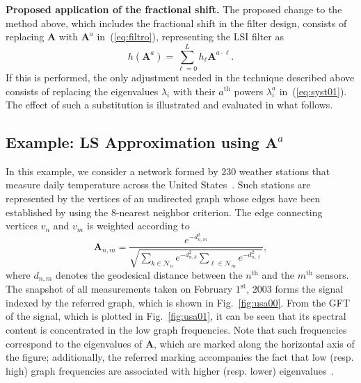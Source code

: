 \noindent\textbf{Proposed application of the fractional shift.} The proposed change to the method above, which includes the fractional shift in the filter design, consists of replacing $\mathbf{A}$ with $\mathbf{A}^a$ in~(\ref{eq:filtro}), representing the LSI filter as
\begin{equation}
    \label{eq:filtrofracnew}
    h(\mathbf{A}^a) = \sum_{\ell=0}^{L} h_\ell \mathbf{A}^{a \cdot \ell}.
\end{equation}
If this is performed, the only adjustment needed in the technique described above consists of replacing the eigenvalues $\lambda_i$ with their $a^{\text{th}}$ powers $\lambda_i^a$ in~(\ref{eq:syst01}). The effect of such a substitution is illustrated and evaluated in what follows.

\subsection{Example: LS Approximation using $\mathbf{A}^{{a}}$}\label{subsec:lsi01}
In this example, we consider a network formed by $230$ weather stations that measure daily temperature across the United States~\parencite{data2011}. Such stations are represented by the vertices of an undirected graph whose edges have been established by using the $8$-nearest neighbor criterion.  The edge connecting vertices $v_n$ and $v_m$ is weighted according to
\begin{equation}
    \mathbf{A}_{n,m}=\frac{e^{-d^2_{n,m}}}{\sqrt{\sum_{k\in\mathcal{N}_n}e^{-d^2_{n,k}}\sum_{\ell\in\mathcal{N}_m}e^{-d^2_{n,\ell}}}},
\end{equation}
where $d_{n,m}$ denotes the geodesical distance between the $n^{\text{th}}$ and the $m^{\text{th}}$ sensors. The snapshot of all measurements taken on February $1^{\text{st}}$, 2003 forms the signal indexed by the referred graph, which is shown in Fig.~\ref{fig:usa00}. From the GFT of the signal, which is plotted in Fig.~\ref{fig:usa01}, it can be seen that its spectral content is concentrated in the low graph frequencies. Note that such frequencies correspond to the eigenvalues of $\mathbf{A}$, which are marked along the horizontal axis of the figure; additionally, the referred marking accompanies the fact that low (resp. high) graph frequencies are associated with higher (resp. lower) eigenvalues~\parencite{sandryhaila2014frequency}.

